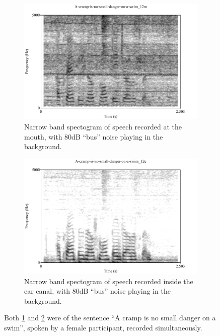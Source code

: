 \documentclass[dissertation,copyright]{uathesis}
\begin{document}
\begin{figure}
\centering
\begin{subfigure}{0.475\textwidth}
  \centering
  \includegraphics[width=1\linewidth]{figure/spctgrmNarrowMthNoise_35.pdf}
  \caption{Narrow band spectogram of speech recorded at the mouth, with 80dB ``bus'' noise playing in the background.}
  \label{spctgrmNarrowMouthNoise_35}
\end{subfigure}%
\hfill
\begin{subfigure}{0.475\textwidth}
  \centering
  \includegraphics[width=1\linewidth]{figure/spctgrmNarrowEarNoise_35.pdf}
  \caption{Narrow band spectogram of speech recorded inside the ear canal, with 80dB ``bus'' noise playing in the background.}
  \label{spctgrmNarrowEarNoise_35}
\end{subfigure}
\caption{Both \ref{spctgrmNarrowMouthNoise_35} and \ref{spctgrmNarrowEarNoise_35} were of the sentence ``A cramp is no small danger on a swim'', spoken by a female participant, recorded simultaneously.}
\label{fig:noise_mth_ear}
\end{figure}
\end{document}
